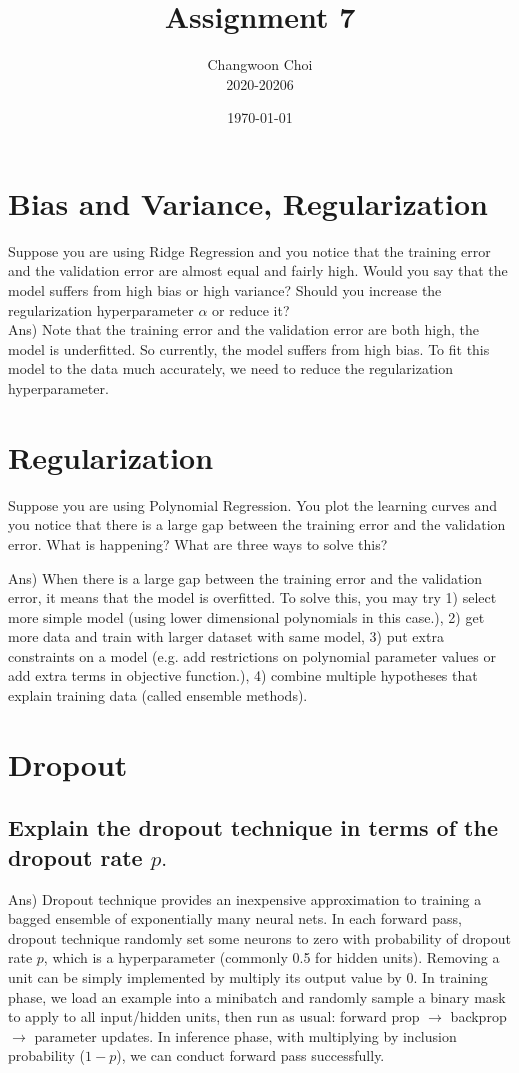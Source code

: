 \documentclass[12pt]{article}%
\begin{document}
\title{Assignment 7}
\author{Changwoon Choi \\ 2020-20206}
\date{\today}
\maketitle

\section{Bias and Variance, Regularization}
Suppose you are using Ridge Regression and you notice that the training error and the validation error are almost equal and fairly high. Would you say that the model suffers from high bias or high variance? Should you increase the regularization hyperparameter $\alpha$ or reduce it?
\\

Ans) Note that the training error and the validation error are both high, the model is underfitted. So currently, the model suffers from high bias. To fit this model to the data much accurately, we need to reduce the regularization hyperparameter.
\section{Regularization}
Suppose you are using Polynomial Regression. You plot the learning curves and you notice that there is a large gap between the training error and the validation error. What is happening? What are three ways to solve this?

Ans) When there is a large gap between the training error and the validation error, it means that the model is overfitted. To solve this, you may try 1) select more simple model (using lower dimensional polynomials in this case.), 2) get more data and train with larger dataset with same model, 3) put extra constraints on a model (e.g. add restrictions on polynomial parameter values or add extra terms in objective function.), 4) combine multiple hypotheses that explain training data (called ensemble methods).

\section{Dropout}

\subsection{Explain the dropout technique in terms of the dropout rate $p.$}
Ans) Dropout technique provides an inexpensive approximation to training a bagged ensemble of exponentially many neural nets. In each forward pass, dropout technique randomly set some neurons to zero with probability of dropout rate $p$, which is a hyperparameter (commonly 0.5 for hidden units). Removing a unit can be simply implemented by multiply its output value by 0. In training phase, we load an example into a minibatch and randomly sample a binary mask to apply to all input/hidden units, then run as usual: forward prop $\rightarrow$ backprop $\rightarrow$ parameter updates. In inference phase, with multiplying by inclusion probability ($1 - p$), we can conduct forward pass successfully.
\end{document}
